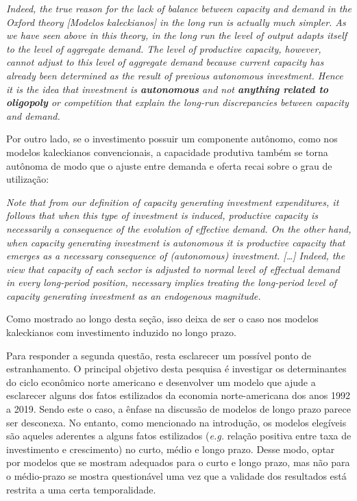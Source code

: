 \begin{citacao}
	\textit{Indeed, the true reason for the lack of balance between capacity and demand in the Oxford theory [Modelos kaleckianos] in the long run is actually much simpler. As we have seen above in this theory, in the long run the level of output adapts itself to the level of aggregate demand. The level of productive capacity, however, cannot adjust to this level of aggregate demand because current capacity has already been determined as the result of previous autonomous investment. Hence it is the idea that investment is \textbf{autonomous} and not \textbf{anything related to oligopoly} or competition that explain the long-run discrepancies between capacity and demand.}
	\cite[p.~120, grifos adicionados]{serrano_sraffian_1995}
\end{citacao}
Por outro lado, se o investimento possuir um componente autônomo, como nos modelos kaleckianos convencionais, a capacidade produtiva também se torna autônoma de modo que o ajuste entre demanda e oferta recai sobre o grau de utilização:
\begin{citacao}
	\textit{Note that from our definition of capacity generating investment expenditures, it follows that when this type of investment is induced, productive capacity is necessarily a consequence of the evolution of effective demand. On the other hand, when capacity generating investment is autonomous it is productive capacity that emerges as a necessary consequence of (autonomous) investment. […] Indeed, the view that capacity of each sector is adjusted to normal level of effectual demand in every long-period position, necessary implies treating the long-period level of capacity generating investment as an endogenous magnitude.} \cite[p.~77]{serrano_sraffian_1995}
\end{citacao}
Como mostrado ao longo desta seção, isso deixa de ser o caso nos modelos kaleckianos com investimento induzido no longo prazo.

Para responder a segunda questão, resta esclarecer um possível ponto de estranhamento. O principal objetivo desta pesquisa é investigar os determinantes do ciclo econômico norte americano e desenvolver um modelo que ajude a esclarecer alguns dos fatos estilizados da economia norte-americana dos anos 1992 a 2019. Sendo este o caso, a ênfase na discussão de modelos de longo prazo parece ser desconexa. 
No entanto, como mencionado na introdução, os modelos elegíveis são aqueles aderentes a alguns fatos estilizados (\textit{e.g.} relação positiva entre taxa de investimento e crescimento)  no curto, médio e longo prazo.
Desse modo, optar por modelos que se mostram adequados para o curto e longo prazo, mas não para o médio-prazo se mostra questionável uma vez que a validade dos resultados está restrita a uma certa temporalidade. 

